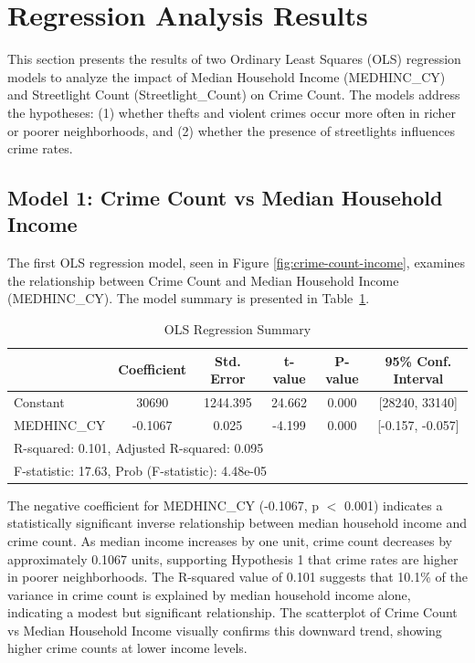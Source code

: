 \documentclass{report}
\begin{document}
\section{Regression Analysis Results}

\par This section presents the results of two Ordinary Least Squares (OLS) regression models to analyze the impact of Median Household Income (MEDHINC\_CY) and Streetlight Count (Streetlight\_Count) on Crime Count. The models address the hypotheses: (1) whether thefts and violent crimes occur more often in richer or poorer neighborhoods, and (2) whether the presence of streetlights influences crime rates.

\subsection{Model 1: Crime Count vs Median Household Income}
\par The first OLS regression model, seen in Figure \ref{fig:crime-count-income}, examines the relationship between Crime Count and Median Household Income (MEDHINC\_CY). The model summary is presented in Table~\ref{tab:model1_summary}.

\begin{table}[htbp]
  \centering
  \caption{OLS Regression Summary}
  \label{tab:model1_summary}
  \begin{tabular}{lccccc}
    \toprule
    & Coefficient & Std. Error & t-value & P-value & 95\% Conf. Interval \\
    \midrule
    Constant & 30690 & 1244.395 & 24.662 & 0.000 & [28240, 33140] \\
    MEDHINC\_CY & -0.1067 & 0.025 & -4.199 & 0.000 & [-0.157, -0.057] \\
    \midrule
    \multicolumn{6}{l}{R-squared: 0.101, Adjusted R-squared: 0.095} \\
    \multicolumn{6}{l}{F-statistic: 17.63, Prob (F-statistic): 4.48e-05} \\
    \bottomrule
  \end{tabular}
\end{table}

\par The negative coefficient for MEDHINC\_CY (-0.1067, p $<$ 0.001) indicates a statistically significant inverse relationship between median household income and crime count. As median income increases by one unit, crime count decreases by approximately 0.1067 units, supporting Hypothesis 1 that crime rates are higher in poorer neighborhoods. The R-squared value of 0.101 suggests that 10.1\% of the variance in crime count is explained by median household income alone, indicating a modest but significant relationship. The scatterplot of Crime Count vs Median Household Income visually confirms this downward trend, showing higher crime counts at lower income levels.
\end{document}
